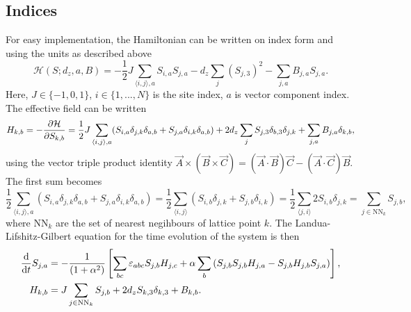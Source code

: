 \documentclass{article}
\begin{document}
    \subsection*{Indices}
    For easy implementation, the Hamiltonian can be written on index form and using the units as described above
    \begin{equation*}
        \mathcal{H}(S; d_z, a, B) = -\frac{1}{2} J \sum_{\langle i, j \rangle, a} S_{i, a} S_{j, a} - d_z \sum_{j} (S_{j,3})^2 -  \sum_{j, a} B_{j, a} S_{j,a}.
    \end{equation*}
    Here, $J\in\{-1, 0, 1\}$, $i\in\{1, ..., N\}$ is the site index, $a$ is vector component index. The effective field can be written
    \begin{align*}
        H_{k, b} = - \pdv{\mathcal{H}}{S_{k, b}} = \frac{1}{2} J \sum_{\langle i, j \rangle, a} (S_{i, a}\delta_{j,k}\delta_{a, b} + S_{j, a}\delta_{i,k}\delta_{a, b}) + 2 d_z \sum_{j} S_{j,3} \delta_{b, 3}\delta_{j, k} +  \sum_{j, a} B_{j, a} \delta_{k,b},
    \end{align*}
    using the vector triple product identity $\vec A \times (\vec B \times \vec C) = (\vec A \cdot \vec B) \vec C - (\vec A \cdot \vec C) \vec B$. The first sum becomes
    \begin{equation*}
        \frac{1}{2}\sum_{\langle i, j \rangle, a} (S_{i, a}\delta_{j,k}\delta_{a, b} + S_{j, a}\delta_{i,k}\delta_{a, b}) = \frac{1}{2}\sum_{\langle i, j \rangle} (S_{i, b}\delta_{j,k} + S_{j, b}\delta_{i,k}) = \frac{1}{2}\sum_{\langle j, i \rangle} 2S_{i, b} \delta_{j, k} = \sum_{j \in \mathrm{NN}_k} S_{j, b},
    \end{equation*}
    where $\mathrm{NN}_k$ are the set of nearest negihbours of lattice point $k$. The Landua-Lifshitz-Gilbert equation for the time evolution of the system is then
    \begin{align}
        \dv{t} S_{j, a} &= - \frac{1}{(1 + \alpha^2)}\left[\sum_{b c}\varepsilon_{abc}S_{j, b}H_{j,c} + \alpha \sum_{b}\left(S_{j, b}S_{j, b}H_{j, a} - S_{j, b}H_{j, b}S_{j, a}\right)\right], \label{LLG} \\
        H_{k, b} &= J\sum_{j \in \mathrm{NN}_k} S_{j, b} + 2d_z S_{k, 3} \delta_{k, 3} +  B_{k, b}. \label{effective field}
    \end{align}
    
\end{document}
